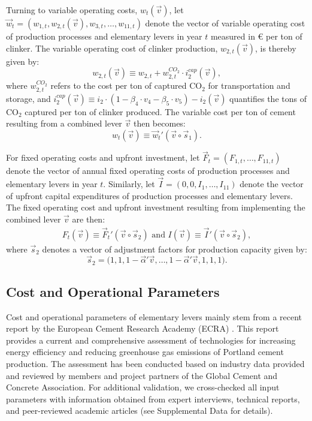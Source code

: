 \documentclass[12pt, a4paper]{article} %
\newcommand{\Suppl}{Supplemental}
\begin{document}
Turning to variable operating costs, $w_t(\vec{v})$, let $\vec{w}_t = (w_{1,t}, w_{2,t}(\vec{v}), w_{3,t}, \ldots, w_{11,t})$ denote the vector of variable operating cost of production processes and elementary levers in year $t$ measured in \euro$ $ per ton of clinker. The variable operating cost of clinker production, $w_{2,t}(\vec{v})$, is thereby given by:
\begin{equation}
w_{2,t}(\vec{v}) \equiv w_{2,t} + w_{2,t}^{CO_2} \cdot i_2^{cap}(\vec{v}),
\end{equation}
where $w_{2,t}^{CO_2}$ refers to the cost per ton of captured CO$_2$ for transportation and storage, and $i_2^{cap}(\vec{v}) \equiv i_2 \cdot (1 - \beta_4 \cdot v_4 - \beta_5 \cdot v_5) - i_2(\vec{v})$ quantifies the tons of CO$_2$ captured per ton of clinker produced. The variable cost per ton of cement resulting from a combined lever $\vec{v}$  then becomes:
\begin{equation}
w_t(\vec{v}) \equiv \vec{w}_t' (\vec{v} \circ \vec{s}_1).
\end{equation}

For fixed operating costs and upfront investment, let $\vec{F}_t = (F_{1,t}, \ldots, F_{11,t})$ denote the vector of annual fixed operating costs of production processes and elementary levers in year $t$. Similarly, let $\vec{I} = (0, 0, I_1, \ldots, I_{11})$ denote the vector of upfront capital expenditures of production processes and elementary levers. The fixed operating cost and upfront investment resulting from implementing the combined lever $\vec{v}$ are then:
\begin{gather}
F_t(\vec{v}) \equiv \vec{F}_t' (\vec{v} \circ \vec{s}_2) \text{ and } I(\vec{v}) \equiv \vec{I}' (\vec{v} \circ \vec{s}_2),
\end{gather}
where $\vec{s}_2$ denotes a vector of adjustment factors for production capacity given by:
$$\vec{s}_2 = \bigl(1, 1, 1-\vec{\alpha}'\vec{v}, \ldots, 1-\vec{\alpha}'\vec{v}, 1, 1, 1 \bigr).$$


\subsection*{Cost and Operational Parameters}

Cost and operational parameters of elementary levers mainly stem from a recent report by the European Cement Research Academy (ECRA) \citep{ecra2022state}. This report provides a current and comprehensive assessment of technologies for increasing energy efficiency and reducing greenhouse gas emissions of Portland cement production. The assessment has been conducted based on industry data provided and reviewed by members and project partners of the Global Cement and Concrete Association. For additional validation, we cross-checked all input parameters with information obtained from expert interviews, technical reports, and peer-reviewed academic articles (see \Suppl$ $ Data for details).
\end{document}
